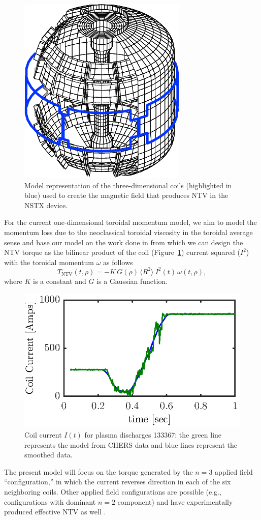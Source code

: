 \documentclass[12pt,lot, lof]{puthesis}
\begin{document}
\begin{figure}
\centering
\includegraphics[width=0.47 \linewidth]{fig5}
\caption{Model representation of the three-dimensional coils (highlighted in
  blue) used to create the magnetic field that produces NTV in the NSTX device.}
  \label{pic_NTV}
\end{figure}
For the current one-dimensional toroidal momentum model, we aim to model the momentum loss due to the neoclassical toroidal viscosity in the toroidal average sense and base our model on the work done in \cite{Zhu06} from which we can design the NTV torque as the bilinear product of the coil (Figure~\ref{pic_NTV}) current squared ($ I^2$) with the toroidal momentum $\omega$ as follows
\begin{equation}
   T_\text{NTV}  (t, \rho) =  - K \, G(\rho) \,  \langle R^2 \rangle \:  I^2(t) \,\omega (t, \rho),
    \label{eqn:ntv}
\end{equation}
where $K$ is a constant and $G$ is a Gaussian function.
\begin{figure}
\centering
\includegraphics[width=0.7 \linewidth]{fig6}  %
\caption{ Coil current $I(t)$ for plasma discharges 133367:
the green line represents the model from CHERS data and  blue lines represent the smoothed data.}
\label{fig:current}
\end{figure}
The present model  will focus on the torque generated by the $n=3$ applied field ``configuration,'' in which the current reverses direction in each of the six neighboring coils. Other applied field configurations are possible (e.g., configurations with dominant $n = 2$ component) and have experimentally produced effective NTV as well \cite{Sabbagh10}.
 
\end{document}
